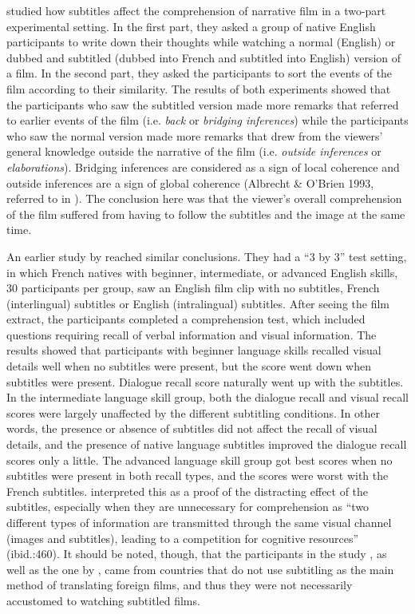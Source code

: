 \documentclass[output=paper]{langsci/langscibook}
\begin{document}
\citet{lee2013} studied how subtitles affect the comprehension of narrative film in a two-part experimental setting. In the first part, they asked a group of native English participants to write down their thoughts while watching a normal (English) or dubbed and subtitled (dubbed into French and subtitled into English) version of a film. In the second part, they asked the participants to sort the events of the film according to their similarity. The results of both experiments showed that the participants who saw the subtitled version made more remarks that referred to earlier events of the film (i.e. \textit{back} or \textit{bridging inferences}) while the participants who saw the normal version made more remarks that drew from the viewers’ general knowledge outside the narrative of the film (i.e. \textit{outside inferences} or \textit{elaborations}). Bridging inferences are considered as a sign of local coherence and outside inferences are a sign of global coherence (Albrecht \& O'Brien 1993, referred to in \citealt{lee2013}). The conclusion here was that the viewer's overall comprehension of the film suffered from having to follow the subtitles and the image at the same time.

An earlier study by \citet{lavaur2011} reached similar conclusions. They had a ``3 by 3'' test setting, in which French natives with beginner, intermediate, or advanced English skills, 30 participants per group, saw an English film clip with no subtitles, French (interlingual) subtitles or English (intralingual) subtitles. After seeing the film extract, the participants completed a comprehension test, which included questions requiring recall of verbal information and visual information. The results showed that participants with beginner language skills recalled visual details well when no subtitles were present, but the score went down when subtitles were present. Dialogue recall score naturally went up with the subtitles. In the intermediate language skill group, both the dialogue recall and visual recall scores were largely unaffected by the different subtitling conditions. In other words, the presence or absence of subtitles did not affect the recall of visual details, and the presence of native language subtitles improved the dialogue recall scores only a little. The advanced language skill group got best scores when no subtitles were present in both recall types, and the scores were worst with the French subtitles. \citet{lavaur2011} interpreted this as a proof of the distracting effect of the subtitles, especially when they are unnecessary for comprehension as ``two different types of information are transmitted through the same visual channel (images and subtitles), leading to a competition for cognitive resources'' (ibid.:460). It should be noted, though, that the participants in the study \citet{lavaur2011}, as well as the one by \citet{lee2013}, came from countries that do not use subtitling as the main method of translating foreign films, and thus they were not necessarily accustomed to watching subtitled films. 
 
\end{document}
